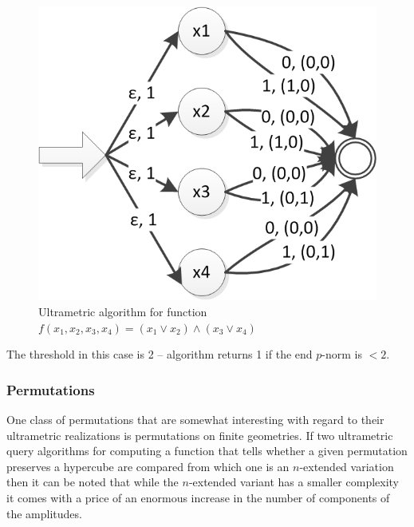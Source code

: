 \documentclass{llncs}
\begin{document}
\begin{figure}
	\centering
	\includegraphics{or_and_or.png}
	\caption{Ultrametric algorithm for function $f(x_1,x_2,x_3,x_4 )=(x_1\vee x_2 )\wedge (x_3\vee x_4 )$}
	  \label{or_and_or}
\end{figure}

The threshold in this case is 2 – algorithm returns 1 if the end $p$-norm is $<2$.

\subsubsection{Permutations}
One class of permutations that are somewhat interesting with regard to their ultrametric realizations is permutations on finite geometries. If two ultrametric query algorithms for computing a function that tells whether a given permutation preserves a hypercube are compared from which one is an $n$-extended variation then it can be noted that while the $n$-extended variant has a smaller complexity it comes with a price of an enormous increase in the number of components of the amplitudes.
\end{document}
